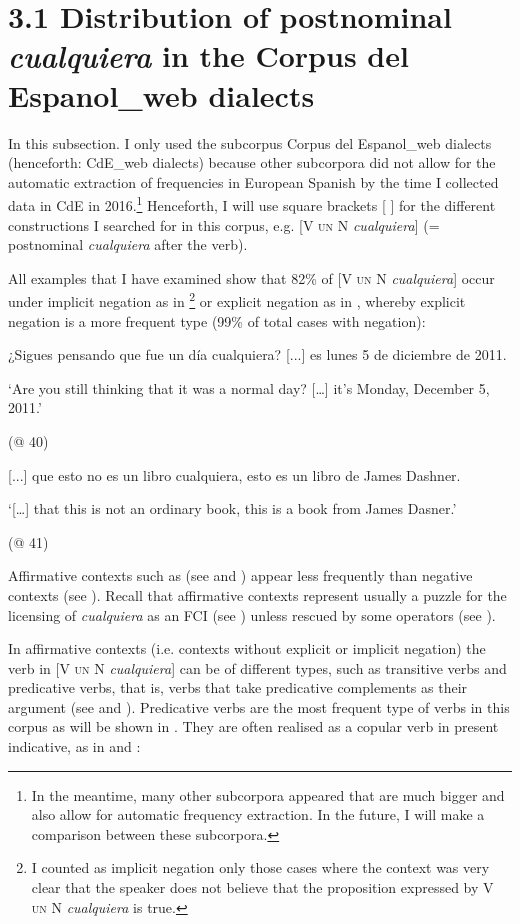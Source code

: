 \section{\textbf{3.1} \textbf{Distribution} \textbf{of} \textbf{postnominal} \textbf{\textit{cualquiera} }\textbf{in} \textbf{the} \textbf{Corpus} \textbf{del} \textbf{Espanol\_web} \textbf{dialects}}

In this subsection. I only used the subcorpus Corpus del Espanol\_web dialects (henceforth: CdE\_web dialects) because other subcorpora did not allow for the automatic extraction of frequencies in European Spanish by the time I collected data in CdE in 2016.\footnote{{In the meantime, many other subcorpora appeared that are much bigger and also allow for automatic frequency extraction. In the future, I will make a comparison between these subcorpora.}} Henceforth, I will use square brackets [ ] for the different constructions I searched for in this corpus, e.g. [V \textsc{un} N \textit{cualquiera}] (= postnominal \textit{cualquiera} after the verb).

  All examples that I have examined show that 82\% of [V \textsc{un} N \textit{cualquiera}] occur under implicit negation as in \footnote{{I counted as implicit negation only those cases where the context was very clear that the speaker does not believe that the proposition expressed by V} \textsc{un} {N} {\textit{cualquiera}} {is true.}} or explicit negation as in , whereby explicit negation is a more frequent type (99\% of total cases with negation):

\label{bkm:Ref42868256}  ¿Sigues pensando que fue un día cualquiera? [...] es lunes 5 de diciembre de 2011.

  ‘Are you still thinking that it was a normal day? […] it’s Monday, December 5, 2011.’

  (@ 40)

\label{bkm:Ref42868258}  [...] que esto no es un libro cualquiera, esto es un libro de James Dashner.

  ‘[…] that this is not an ordinary book, this is a book from James Dasner.’

  (@ 41)

Affirmative contexts such as (see  and ) appear less frequently than negative contexts (see ). Recall that affirmative contexts represent usually a puzzle for the licensing of \textit{cualquiera} as an FCI (see ) unless rescued by some operators (see ). 

  In affirmative contexts (i.e. contexts without explicit or implicit negation) the verb in [V \textsc{un} N \textit{cualquiera}] can be of different types, such as transitive verbs and predicative verbs, that is, verbs that take predicative complements as their argument (see  and ). Predicative verbs are the most frequent type of verbs in this corpus as will be shown in . They are often realised as a copular verb in present indicative, as in  and :

